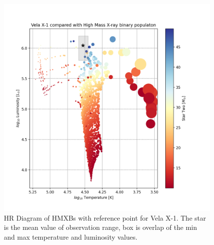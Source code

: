 \documentclass[12pt, a4paper]{article}
\begin{document}
            \begin{figure}[H] 
                \centering
                \includegraphics[width=\textwidth]{figs/GeneratedFigs/VelaX-1/VelaX1HMXBPopulationHRComp.png}
                \caption{HR Diagram of HMXBs with reference point for Vela X-1. The star is the mean value of observation range, box is overlap of the min and max temperature and luminosity values.}
                \label{VelaX1HMXBPopulationHRComp}
            \end{figure}
    

    
\end{document}
